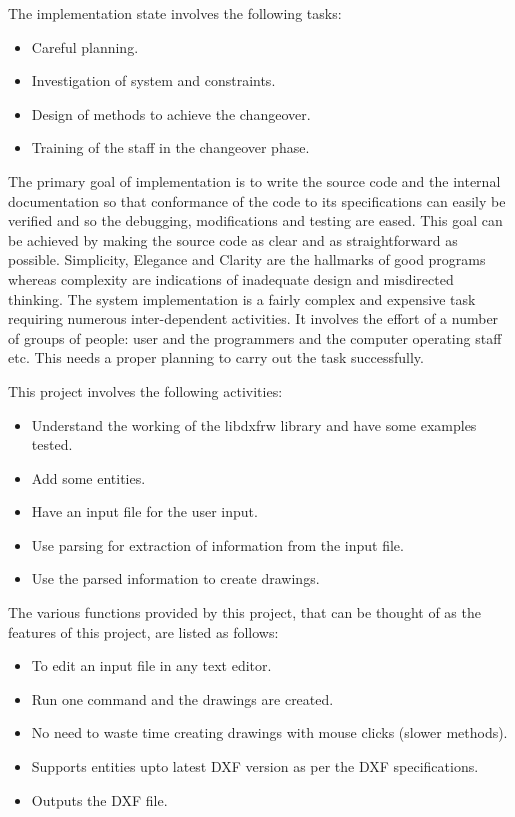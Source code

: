 The implementation state involves the following tasks:
\begin{itemize}
	\item Careful planning.
	\item Investigation of system and constraints.
	\item Design of methods to achieve the changeover.
	\item Training of the staff in the changeover phase.
\end{itemize}

The primary goal of implementation is to write the source code and the internal documentation so that conformance of the code to its specifications can easily be verified and so the debugging, modifications and testing are eased. This goal can be achieved by making the source code as clear and as straightforward as possible. Simplicity, Elegance and Clarity are the hallmarks of good programs whereas complexity are indications of inadequate design and misdirected thinking. The system implementation is a fairly complex and expensive task requiring numerous inter-dependent activities. It involves the effort of a number of groups of people: user and the programmers and the computer operating staff etc. This needs a proper planning to carry out the task successfully.

This project involves the following activities:
\begin{itemize}
	\item Understand the working of the libdxfrw library and have some examples tested.
	\item Add some entities.
	\item Have an input file for the user input.
	\item Use parsing for extraction of information from the input file.
	\item Use the parsed information to create drawings.
\end{itemize}	

The various functions provided by this project, that can be thought of as the features of this project, are listed as follows:

\begin{itemize}
	\item To edit an input file in any text editor.
	\item Run one command and the drawings are created.
	\item No need to waste time creating drawings with mouse clicks (slower methods).
	\item Supports entities upto latest DXF version as per the DXF specifications.
	\item Outputs the DXF file.

\end{itemize}
